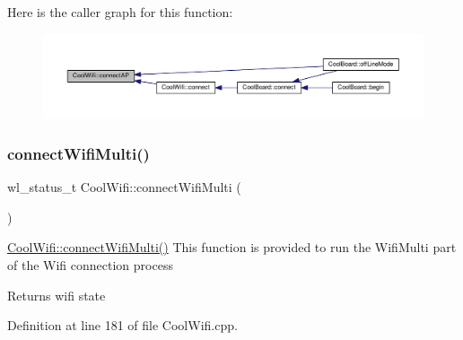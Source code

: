 Here is the caller graph for this function\+:\nopagebreak
\begin{figure}[H]
\begin{center}
\leavevmode
\includegraphics[width=350pt]{d7/d29/class_cool_wifi_a7c857f27161782f5ef1d62d552aff971_icgraph}
\end{center}
\end{figure}
\mbox{\label{class_cool_wifi_a419de92d738f14b7444cf822b3ab0070}} 
\subsubsection{\texorpdfstring{connect\+Wifi\+Multi()}{connectWifiMulti()}}
{\footnotesize\ttfamily wl\+\_\+status\+\_\+t Cool\+Wifi\+::connect\+Wifi\+Multi (\begin{DoxyParamCaption}{ }\end{DoxyParamCaption})}

\hyperlink{class_cool_wifi_a419de92d738f14b7444cf822b3ab0070}{Cool\+Wifi\+::connect\+Wifi\+Multi()} This function is provided to run the Wifi\+Multi part of the Wifi connection process

\begin{DoxyReturn}{Returns}
wifi state 
\end{DoxyReturn}


Definition at line 181 of file Cool\+Wifi.\+cpp.



